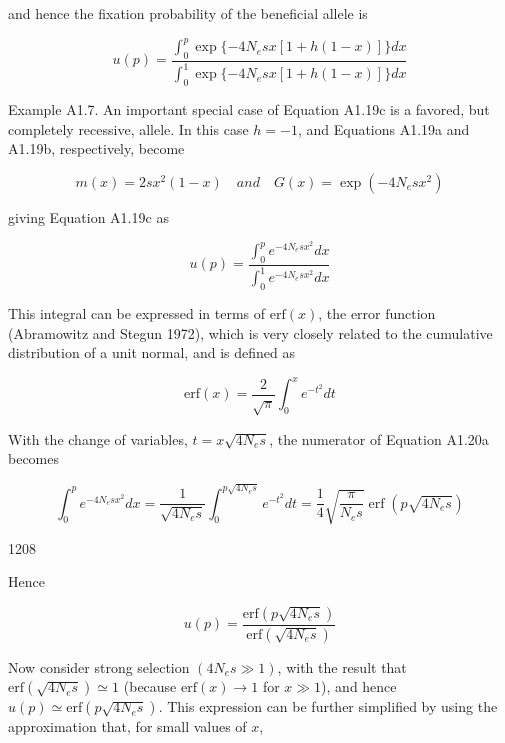 \documentclass{article}
\begin{document}
and hence the fixation probability of the beneficial allele is

\begin{equation}
u(p)=\frac{\int_{0}^{p}\exp\{-4N_{e}s x[1+h(1-x)]\}d x}{\int_{0}^{1}\exp\{-4N_{e}s x[1+h(1-x)]\}d x}
\end{equation}

Example A1.7. An important special case of Equation A1.19c is a favored, but completely recessive, allele. In this case  $ h = -1 $, and Equations A1.19a and A1.19b, respectively, become

\begin{equation}
m(x)=2s x^{2}(1-x)\quad and\quad G(x)=\exp\left(-4N_{e}s x^{2}\right)
\end{equation}

giving Equation A1.19c as

\begin{equation}
u(p)=\frac{\int_{0}^{p}e^{-4N_{e}s x^{2}}d x}{\int_{0}^{1}e^{-4N_{e}s x^{2}}d x}
\end{equation}

This integral can be expressed in terms of  $ \text{erf}(x) $, the  $ \text{error function} $ (Abramowitz and Stegun 1972), which is very closely related to the cumulative distribution of a unit normal, and is defined as

\begin{equation}
\mathrm{erf}(x)=\frac{2}{\sqrt{\pi}}\int_{0}^{x}e^{-t^{2}}dt
\end{equation}

With the change of variables,  $ t = x \sqrt{4N_e s} $, the numerator of Equation A1.20a becomes

\begin{equation}
\int_{0}^{p}e^{-4N_{e}s x^{2}}d x=\frac{1}{\sqrt{4N_{e}s}}\int_{0}^{p\sqrt{4N_{e}s}}e^{-t^{2}}d t=\frac{1}{4}\sqrt{\frac{\pi}{N_{e}s}}\operatorname{e r f}\left(p\sqrt{4N_{e}s}\right)
\end{equation}

1208

Hence

\begin{equation}
u(p)=\frac{\mathrm{erf}\left(p\sqrt{4N_{e}s}\right)}{\mathrm{erf}\left(\sqrt{4N_{e}s}\right)}
\end{equation}

Now consider strong selection  $ (4N_e s \gg 1) $, with the result that  $ \text{erf}\left(\sqrt{4N_e s}\right) \simeq 1 $ (because  $ \text{erf}(x) \to 1 $ for  $ x \gg 1 $), and hence  $ u(p) \simeq \text{erf}\left(p\sqrt{4N_e s}\right) $. This expression can be further simplified by using the approximation that, for small values of  $ x $,
\end{document}

